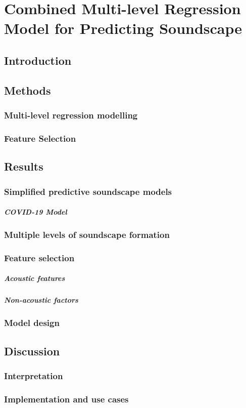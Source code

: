 \chapter{Combined Multi-level Regression Model for Predicting Soundscape}
\label{ch:mlm}

\section{Introduction}

\section{Methods}
  \subsection{Multi-level regression modelling}
  \subsection{Feature Selection}

\section{Results}
  \subsection{Simplified predictive soundscape models}
    \paragraph*{COVID-19 Model}

  \subsection{Multiple levels of soundscape formation}

  \subsection{Feature selection}
    \paragraph*{Acoustic features}
    \paragraph*{Non-acoustic factors}

  \subsection{Model design}

\section{Discussion}
  \subsection{Interpretation}
  \subsection{Implementation and use cases}


